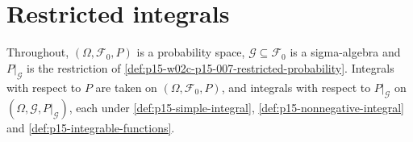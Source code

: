 \section{Restricted integrals}
\label{sec:annex-p15-w02c-p15-007-restricted-integrals}

Throughout, \((\Omega,\mathcal F_0,P)\) is a probability space,
\(\mathcal G\subseteq\mathcal F_0\) is a sigma-algebra and
\(P|_{\mathcal G}\) is the restriction of
\cref{def:p15-w02c-p15-007-restricted-probability}. Integrals with respect
to \(P\) are taken on \((\Omega,\mathcal F_0,P)\), and integrals with
respect to \(P|_{\mathcal G}\) on \((\Omega,\mathcal G,P|_{\mathcal G})\),
each under \cref{def:p15-simple-integral},
\cref{def:p15-nonnegative-integral} and
\cref{def:p15-integrable-functions}.

